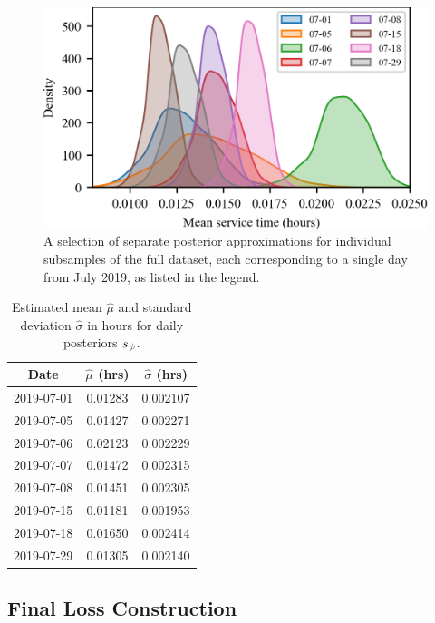 \begin{figure}
    \centering
    \includegraphics[width=0.8\linewidth]{media/s_phi_2019-07_selection.png}
    \caption{A selection of separate posterior approximations for individual subsamples of the full dataset, each corresponding to a single day from July 2019, as listed in the legend.}
    \label{fig:s-phi-selection}
\end{figure}


\begin{table}[htb]
    \centering
    \begin{tabular}{|c||c|c|}
        \hline
        Date & $\hat\mu$ (hrs) & $\hat\sigma$ (hrs) \\
        \hline\hline 
        2019-07-01 & 0.01283 & 0.002107 \\
        \hline
        2019-07-05 & 0.01427 & 0.002271 \\
        \hline 
        2019-07-06 & 0.02123 & 0.002229 \\
        \hline
        2019-07-07 & 0.01472 & 0.002315 \\
        \hline
        2019-07-08 & 0.01451 & 0.002305 \\
        \hline 
        2019-07-15 & 0.01181 & 0.001953 \\
        \hline
        2019-07-18 & 0.01650 & 0.002414 \\
        \hline
        2019-07-29 & 0.01305 & 0.002140 \\
        \hline
    \end{tabular}
    \caption{Estimated mean $\hat\mu$ and standard deviation $\hat\sigma$ in hours for daily posteriors $s_{\psi}$.}
    \label{tab:s-phi-selection}
\end{table}


\subsection{Final Loss Construction}

